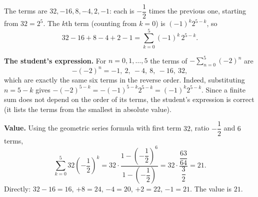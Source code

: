 The terms are $32,-16,8,-4,2,-1$: each is $-\dfrac{1}{2}$ times the previous one, starting from $32=2^5$. The $k$th term (counting from $k=0$) is $(-1)^k2^{5-k}$, so
\[32-16+8-4+2-1=\sum_{k=0}^{5}(-1)^k\,2^{5-k}.\]

\textbf{The student's expression.} For $n=0,1,\dots,5$ the terms of $-\displaystyle\sum_{n=0}^{5}(-2)^n$ are
\[-(-2)^n=-1,\ 2,\ -4,\ 8,\ -16,\ 32,\]
which are exactly the same six terms in the reverse order. Indeed, substituting $n=5-k$ gives $-(-2)^{5-k}=-(-1)^{5-k}2^{5-k}=(-1)^{k}2^{5-k}$. Since a finite sum does not depend on the order of its terms, the student's expression is correct (it lists the terms from the smallest in absolute value).

\textbf{Value.} Using the geometric series formula with first term $32$, ratio $-\dfrac{1}{2}$ and $6$ terms,
\[\sum_{k=0}^{5}32\left(-\dfrac{1}{2}\right)^k=32\cdot\dfrac{1-\left(-\dfrac{1}{2}\right)^6}{1-\left(-\dfrac{1}{2}\right)}=32\cdot\dfrac{\dfrac{63}{64}}{\dfrac{3}{2}}=21.\]
Directly: $32-16=16$, $+8=24$, $-4=20$, $+2=22$, $-1=21$. The value is $\boxed{21}$.
